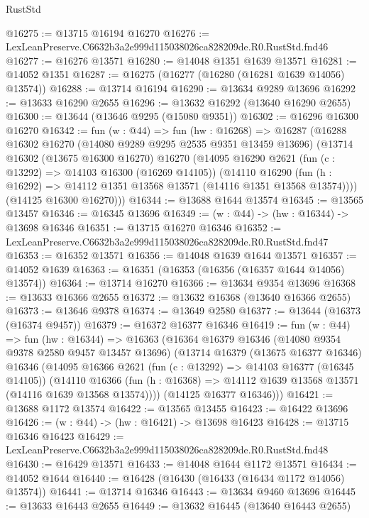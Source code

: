 \begin{lexlean}{RustStd}
\begin{coremodule}
@16275 := @13715 @16194 @16270
@16276 := LexLeanPreserve.C6632b3a2e999d115038026ca828209de.R0.RustStd.fnd46
@16277 := @16276 @13571
@16280 := @14048 @1351 @1639 @13571
@16281 := @14052 @1351
@16287 := @16275 (@16277 (@16280 (@16281 @1639 @14056) @13574))
@16288 := @13714 @16194
@16290 := @13634 @9289 @13696
@16292 := @13633 @16290 @2655
@16296 := @13632 @16292 (@13640 @16290 @2655)
@16300 := @13644 (@13646 @9295 (@15080 @9351))
@16302 := @16296 @16300 @16270
@16342 := fun (w : @44) =>
  fun (hw : @16268) =>
  @16287
    (@16288
      @16302
      @16270
      (@14080 @9289 @9295 @2535 @9351 @13459 @13696)
      (@13714
        @16302
        (@13675 @16300 @16270)
        @16270
        (@14095
          @16290
          @2621
          (fun (c : @13292) => @14103 @16300 (@16269 @14105))
          (@14110
            @16290
            (fun (h : @16292) => @14112 @1351 @13568 @13571 (@14116 @1351 @13568 @13574))))
        (@14125 @16300 @16270)))
@16344 := @13688 @1644 @13574
@16345 := @13565 @13457
@16346 := @16345 @13696
@16349 := (w : @44) -> (hw : @16344) -> @13698 @16346
@16351 := @13715 @16270 @16346
@16352 := LexLeanPreserve.C6632b3a2e999d115038026ca828209de.R0.RustStd.fnd47
@16353 := @16352 @13571
@16356 := @14048 @1639 @1644 @13571
@16357 := @14052 @1639
@16363 := @16351 (@16353 (@16356 (@16357 @1644 @14056) @13574))
@16364 := @13714 @16270
@16366 := @13634 @9354 @13696
@16368 := @13633 @16366 @2655
@16372 := @13632 @16368 (@13640 @16366 @2655)
@16373 := @13646 @9378
@16374 := @13649 @2580
@16377 := @13644 (@16373 (@16374 @9457))
@16379 := @16372 @16377 @16346
@16419 := fun (w : @44) =>
  fun (hw : @16344) =>
  @16363
    (@16364
      @16379
      @16346
      (@14080 @9354 @9378 @2580 @9457 @13457 @13696)
      (@13714
        @16379
        (@13675 @16377 @16346)
        @16346
        (@14095
          @16366
          @2621
          (fun (c : @13292) => @14103 @16377 (@16345 @14105))
          (@14110
            @16366
            (fun (h : @16368) => @14112 @1639 @13568 @13571 (@14116 @1639 @13568 @13574))))
        (@14125 @16377 @16346)))
@16421 := @13688 @1172 @13574
@16422 := @13565 @13455
@16423 := @16422 @13696
@16426 := (w : @44) -> (hw : @16421) -> @13698 @16423
@16428 := @13715 @16346 @16423
@16429 := LexLeanPreserve.C6632b3a2e999d115038026ca828209de.R0.RustStd.fnd48
@16430 := @16429 @13571
@16433 := @14048 @1644 @1172 @13571
@16434 := @14052 @1644
@16440 := @16428 (@16430 (@16433 (@16434 @1172 @14056) @13574))
@16441 := @13714 @16346
@16443 := @13634 @9460 @13696
@16445 := @13633 @16443 @2655
@16449 := @13632 @16445 (@13640 @16443 @2655)

\end{coremodule}
\end{lexlean}
